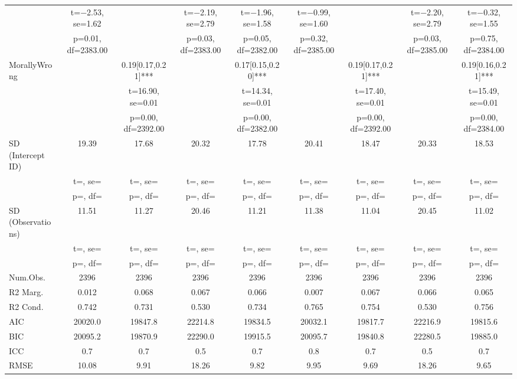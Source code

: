 \documentclass[]{report}
\begin{document}
\begin{table}
{\begin{tabular}[t]{lcccccccc}
			& t=\num{-2.53}, se=\num{1.62} &  & t=\num{-2.19}, se=\num{2.79} & t=\num{-1.96}, se=\num{1.58} & t=\num{-0.99}, se=\num{1.60} &  & t=\num{-2.20}, se=\num{2.79} & t=\num{-0.32}, se=\num{1.55}\\
			& p=\num{0.01}, df=\num{2383.00} &  & p=\num{0.03}, df=\num{2383.00} & p=\num{0.05}, df=\num{2382.00} & p=\num{0.32}, df=\num{2385.00} &  & p=\num{0.03}, df=\num{2385.00} & p=\num{0.75}, df=\num{2384.00}\\
			MorallyWrong &  & \num{0.19}[\num{0.17},\num{0.21}]*** &  & \num{0.17}[\num{0.15},\num{0.20}]*** &  & \num{0.19}[\num{0.17},\num{0.21}]*** &  & \num{0.19}[\num{0.16},\num{0.21}]***\\
			&  & t=\num{16.90}, se=\num{0.01} &  & t=\num{14.34}, se=\num{0.01} &  & t=\num{17.40}, se=\num{0.01} &  & t=\num{15.49}, se=\num{0.01}\\
			&  & p=\num{0.00}, df=\num{2392.00} &  & p=\num{0.00}, df=\num{2382.00} &  & p=\num{0.00}, df=\num{2392.00} &  & p=\num{0.00}, df=\num{2384.00}\\
			SD (Intercept ID) & \num{19.39} & \num{17.68} & \num{20.32} & \num{17.78} & \num{20.41} & \num{18.47} & \num{20.33} & \num{18.53}\\
			& t=, se= & t=, se= & t=, se= & t=, se= & t=, se= & t=, se= & t=, se= & t=, \vphantom{1} se=\\
			& p=, df= & p=, df= & p=, df= & p=, df= & p=, df= & p=, df= & p=, df= & p=, \vphantom{1} df=\\
			SD (Observations) & \num{11.51} & \num{11.27} & \num{20.46} & \num{11.21} & \num{11.38} & \num{11.04} & \num{20.45} & \num{11.02}\\
			& t=, se= & t=, se= & t=, se= & t=, se= & t=, se= & t=, se= & t=, se= & t=, se=\\
			& p=, df= & p=, df= & p=, df= & p=, df= & p=, df= & p=, df= & p=, df= & p=, df=\\
			\midrule
			Num.Obs. & \num{2396} & \num{2396} & \num{2396} & \num{2396} & \num{2396} & \num{2396} & \num{2396} & \num{2396}\\
			R2 Marg. & \num{0.012} & \num{0.068} & \num{0.067} & \num{0.066} & \num{0.007} & \num{0.067} & \num{0.066} & \num{0.065}\\
			R2 Cond. & \num{0.742} & \num{0.731} & \num{0.530} & \num{0.734} & \num{0.765} & \num{0.754} & \num{0.530} & \num{0.756}\\
			AIC & \num{20020.0} & \num{19847.8} & \num{22214.8} & \num{19834.5} & \num{20032.1} & \num{19817.7} & \num{22216.9} & \num{19815.6}\\
			BIC & \num{20095.2} & \num{19870.9} & \num{22290.0} & \num{19915.5} & \num{20095.7} & \num{19840.8} & \num{22280.5} & \num{19885.0}\\
			ICC & \num{0.7} & \num{0.7} & \num{0.5} & \num{0.7} & \num{0.8} & \num{0.7} & \num{0.5} & \num{0.7}\\
			RMSE & \num{10.08} & \num{9.91} & \num{18.26} & \num{9.82} & \num{9.95} & \num{9.69} & \num{18.26} & \num{9.65}\\
			\bottomrule
	\end{tabular}}
\end{table}
\end{document}

